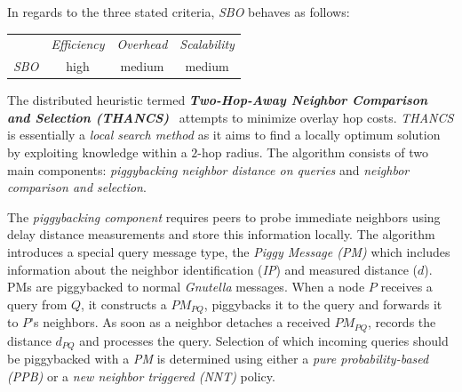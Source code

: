 %
In regards to the three stated criteria, \emph{SBO} behaves as follows:
\begin{center}
{\footnotesize
\begin{tabular}{rccc}
\multicolumn{1}{r}{} &
\multicolumn{1}{c}{\emph{Efficiency}} &
\multicolumn{1}{c}{\emph{Overhead}} &
\multicolumn{1}{c}{\emph{Scalability}}
\\
\cline{2-4}
\emph{SBO} &
high &
medium &
%
medium
\end{tabular}
}
\end{center}


The distributed heuristic termed 
\textbf{\emph{Two-Hop-Away Neighbor Comparison and Selection (THANCS)}}~\cite{LNXE2005,L2008}
attempts to minimize overlay hop costs.
\emph{THANCS} is essentially a \emph{local search method} as it aims 
to find a locally optimum solution by exploiting knowledge within 
a $2$-hop radius. The algorithm consists of two main components:
\emph{piggybacking neighbor distance on queries} and
\emph{neighbor comparison and selection}.

The \emph{piggybacking component} requires peers 
to probe immediate neighbors using delay distance measurements 
and store this information locally. 
The algorithm introduces a special query message type, 
the \emph{Piggy Message (PM)} which includes information about 
the neighbor identification (\emph{IP}) and measured distance ($d$). PMs are
piggybacked to normal
\emph{Gnutella} messages. 
When a node $P$ receives a query from $Q$, it constructs a
$PM_{PQ}$, piggybacks it to the query and forwards it to $P$'s neighbors. 
As soon as a neighbor detaches a received $PM_{PQ}$, records the distance 
$d_{PQ}$ and processes the query.
Selection of which incoming queries
should be piggybacked with a \emph{PM} is determined using either a
\emph{pure probability-based (PPB)} or a \emph{new neighbor triggered (NNT)}
policy.


